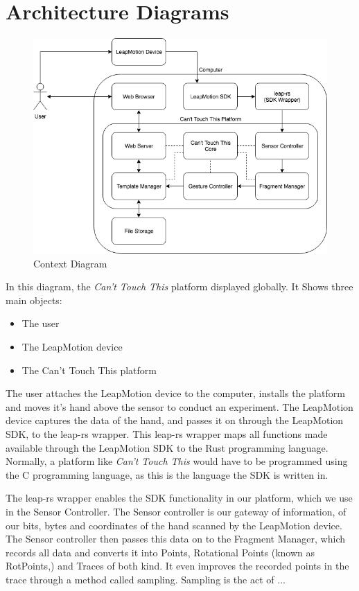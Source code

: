 \documentclass[a4paper]{article}
\providecommand{\tightlist}{%
\setlength{\itemsep}{0pt}\setlength{\parskip}{0pt}}
\begin{document}
  \section{Architecture Diagrams}
  \begin{figure}[h]
    \caption{Context Diagram}
    \centering
    \includegraphics[width=\linewidth]{context-diagram}
  \end{figure}
  In this diagram, the \textit{Can't Touch This} platform displayed globally. It
  Shows three main objects:
  \begin{itemize}
    \tightlist
    \item The user
    \item The LeapMotion device
    \item The Can't Touch This platform
  \end{itemize}
  The user attaches the LeapMotion device to the computer, installs the platform
  and moves it's hand above the sensor to conduct an experiment. The LeapMotion
  device captures the data of the hand, and passes it on through the LeapMotion
  SDK, to the leap-rs wrapper. This leap-rs wrapper maps all functions made
  available through the LeapMotion SDK to the Rust programming language.
  Normally, a platform like \textit{Can't Touch This} would have to be
  programmed using the C programming language, as this is the language the SDK
  is written in.

  The leap-rs wrapper enables the SDK functionality in our platform, which we
  use in the Sensor Controller. The Sensor controller is our gateway of
  information, of our bits, bytes and coordinates of the hand scanned by the
  LeapMotion device. The Sensor controller then passes this data on to the
  Fragment Manager, which records all data and converts it into Points,
  Rotational Points (known as RotPoints,) and Traces of both kind. It even
  improves the recorded points in the trace through a method called sampling.
  Sampling is the act of ... %
\end{document}
